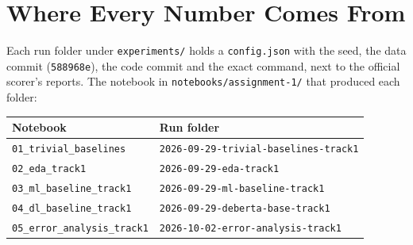 \section{Where Every Number Comes From}
\label{app:runs}

Each run folder under \texttt{experiments/} holds a \texttt{config.json} with the seed, the data commit (\texttt{588968e}), the code commit and the exact command, next to the official scorer's reports. The notebook in \texttt{notebooks/assignment-1/} that produced each folder:

\begin{center}
\scriptsize
\setlength{\tabcolsep}{3pt}
\begin{tabular}{@{}ll@{}}
\toprule
Notebook & Run folder \\
\midrule
\texttt{01\_trivial\_baselines} & \texttt{2026-09-29-trivial-baselines-track1} \\
\texttt{02\_eda\_track1} & \texttt{2026-09-29-eda-track1} \\
\texttt{03\_ml\_baseline\_track1} & \texttt{2026-09-29-ml-baseline-track1} \\
\texttt{04\_dl\_baseline\_track1} & \texttt{2026-09-29-deberta-base-track1} \\
\texttt{05\_error\_analysis\_track1} & \texttt{2026-10-02-error-analysis-track1} \\
\bottomrule
\end{tabular}
\end{center}
